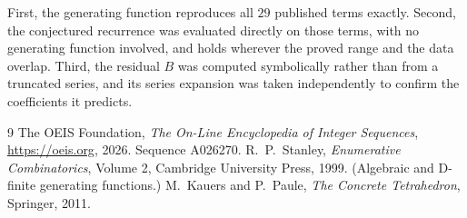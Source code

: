 \documentclass[11pt,a4paper]{article}
\theoremstyle{plain}
\theoremstyle{definition}
\begin{document}
First, the generating function reproduces all $29$ published terms exactly. Second,
the conjectured recurrence was evaluated directly on those terms, with no generating function
involved, and holds wherever the proved range and the data overlap. Third, the residual $B$ was
computed symbolically rather than from a truncated series, and its series expansion was taken
independently to confirm the coefficients it predicts.

\begin{thebibliography}{9}
 The OEIS Foundation, \emph{The On-Line Encyclopedia of Integer Sequences},
\url{https://oeis.org}, 2026. Sequence A026270.
 R.~P.~Stanley, \emph{Enumerative Combinatorics}, Volume 2, Cambridge
University Press, 1999. (Algebraic and D-finite generating functions.)
 M.~Kauers and P.~Paule, \emph{The Concrete Tetrahedron}, Springer, 2011.
\end{thebibliography}
\end{document}
